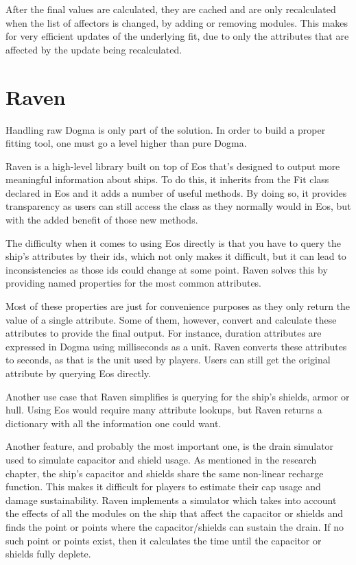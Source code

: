 After the final values are calculated, they are cached and are only recalculated when the list of affectors is changed, by adding or removing modules. This makes for very efficient updates of the underlying fit, due to only the attributes that are affected by the update being recalculated.

\section{Raven}
Handling raw Dogma is only part of the solution. In order to build a proper fitting tool, one must go a level higher than pure Dogma.

Raven is a high-level library built on top of Eos that’s designed to output more meaningful information about ships. To do this, it inherits from the Fit class declared in Eos and it adds a number of useful methods. By doing so, it provides transparency as users can still access the class as they normally would  in Eos, but with the added benefit of those new methods.

The difficulty when it comes to using Eos directly is that you have to query the ship’s attributes by their ids, which not only makes it difficult, but it can lead to inconsistencies as those ids could change at some point. Raven solves this by providing named properties for the most common attributes.

Most of these properties are just for convenience purposes as they only return the value of a single attribute. Some of them, however, convert and calculate these attributes to provide the final output. For instance, duration attributes are expressed in Dogma using milliseconds as a unit. Raven converts these attributes to seconds, as that is the unit used by players. Users can still get the original attribute by querying Eos directly.

Another use case that Raven simplifies is querying for the ship’s shields, armor or hull. Using Eos would require many attribute lookups, but Raven returns a dictionary with all the information one could want.

Another feature, and probably the most important one, is the drain simulator used to simulate capacitor and shield usage. As mentioned in the research chapter, the ship’s capacitor and shields share the same non-linear recharge function. This makes it difficult for players to estimate their cap usage and damage sustainability. Raven implements a simulator which takes into account the effects of all the modules on the ship that affect the capacitor or shields and finds the point or points where the capacitor/shields can sustain the drain. If no such point or points exist, then it calculates the time until the capacitor or shields fully deplete.

